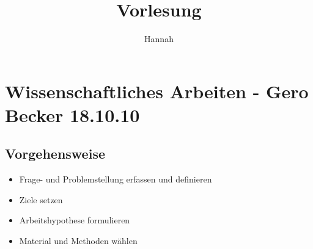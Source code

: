 \documentclass[12pt]{article}
\begin{document}
\begin{titlepage}
\author{Hannah} 
\title{Vorlesung} 
\maketitle
\newpage
\tableofcontents
\end{titlepage} 


\section{Wissenschaftliches Arbeiten - Gero Becker 18.10.10}

\subsection*{Vorgehensweise}
\begin{itemize}
  \item Frage- und Problemstellung erfassen und definieren
  \item Ziele setzen
  \item Arbeitshypothese formulieren
  \item Material und Methoden wählen
\end{itemize}
\end{document}
